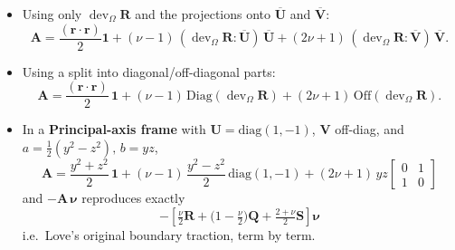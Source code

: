 \begin{itemize}
\tightlist
\item
  Using only \(\operatorname{dev}_{\Omega}\bm{R}\) and the projections onto
  \(\overline{\mathbf{U}}\) and \(\overline{\mathbf{V}}\): \[
  \mathbf{A}
  =\frac{(\bm{r}\cdot\bm{r})}{2}\mathbf{1}
  +(\nu-1)\,(\operatorname{dev}_{\Omega}\bm{R}\!:\!\overline{\mathbf{U}})\,\overline{\mathbf{U}}
  +(2\nu+1)\,(\operatorname{dev}_{\Omega}\bm{R}\!:\!\overline{\mathbf{V}})\,\overline{\mathbf{V}}.
  \]
\item
  Using a split into diagonal/off-diagonal parts: \[
  \mathbf{A}
  =\frac{(\bm{r}\cdot\bm{r})}{2}\,\mathbf{1}
  +(\nu-1)\,\mathrm{Diag}(\operatorname{dev}_{\Omega}\bm{R})
  +(2\nu+1)\,\mathrm{Off}(\operatorname{dev}_{\Omega}\bm{R}).
  \]

\item In a \textbf{Principal-axis frame} with \({\mathbf{U}}=\mathrm{diag}(1,-1)\), \({\mathbf{V}}\)
off-diag, and \(a=\tfrac12(y^2-z^2),\,b=yz\), \[
\mathbf{A}
=\frac{y^2+z^2}{2}\,\mathbf{1}
+(\nu-1)\,\frac{y^2-z^2}{2}\,\mathrm{diag}(1,-1)
+(2\nu+1)\,yz
\begin{bmatrix}
0&1 \\
1&0\end{bmatrix}
\]
and 
\(-\mathbf{A}\,\bm{\nu}\)
reproduces exactly
\[
-\left[\tfrac{\nu}{2}\bm{R}+\Big(1-\tfrac{\nu}{2}\Big)\mathbf{Q}+\tfrac{2+\nu}{2}\mathbf{S}\right]\bm{\nu}
\] 
i.e.~Love's original boundary traction, term by term.
\end{itemize}


